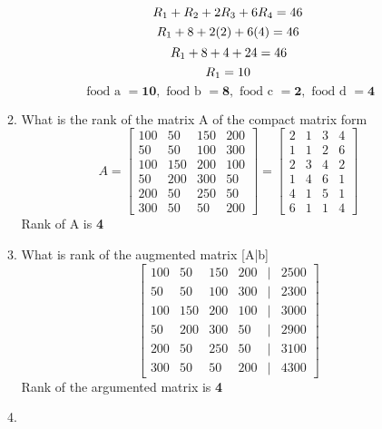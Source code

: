 \documentclass[11pt]{article}
\begin{document}
\begin{enumerate}
\begin{enumerate}
\[
    R_1 + R_2 + 2R_3 + 6R_4 = 46 \\
\]
\[
    R_1 + 8 + 2(2) + 6(4) = 46 \\
\]
\[
    R_1 + 8 + 4 + 24 = 46 \\
\]
\[
    R_1 = 10 \\
\]
\[
\text{ food a } = \textbf{10}, \text{ food b } = \textbf{8}, \text{ food c } = \textbf{2}, \text{ food d } = \textbf{4}
\]
\item What is the rank of the matrix A of the compact matrix form
\[
    A = \begin{bmatrix}
        100 & 50 & 150 & 200 \\
        50 & 50 & 100 & 300 \\
        100 & 150 & 200 & 100 \\
        50 & 200 & 300 & 50 \\
        200 & 50 & 250 & 50 \\
        300 & 50 & 50 & 200
    \end{bmatrix}
    = 
    \begin{bmatrix}
        2 & 1 & 3 & 4 \\
        1 & 1 & 2 & 6 \\
        2 & 3 & 4 & 2 \\
        1 & 4 & 6 & 1 \\
        4 & 1 & 5 & 1 \\
        6 & 1 & 1 & 4
    \end{bmatrix} 
\]
Rank of A is \textbf{4}


\item What is rank of the augmented matrix [A|b]
\[
    \begin{bmatrix}
        100 & 50 & 150 & 200 &|& 2500 \\
        50 & 50 & 100 & 300 &|& 2300 \\
        100 & 150 & 200 & 100 &|& 3000 \\
        50 & 200 & 300 & 50 &|& 2900 \\
        200 & 50 & 250 & 50 &|& 3100 \\
        300 & 50 & 50 & 200 &|& 4300
    \end{bmatrix}
\]
Rank of the argumented matrix is \textbf{4}

\item 

\end{enumerate}


\end{enumerate}
\end{document}
